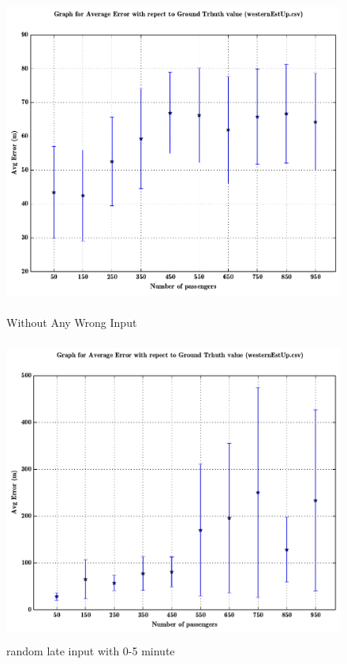 \documentclass[a4paper,12pt]{report}
\begin{document}
\begin{figure}[h!]

\centering
\includegraphics[height=10cm,width=17cm]{00_withoutDelay.pdf}
\caption{Without Any Wrong Input}

\centering
\includegraphics[height=10cm,width=17cm]{01_1prob-0-5minlate.pdf}
\caption{random late input with 0-5 minute}

\end{figure}
\end{document}
